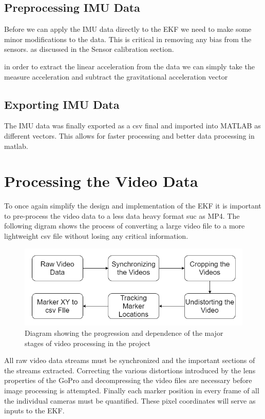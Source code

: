 \subsection{Preprocessing IMU Data}
Before we can apply the IMU data directly to the EKF we need to make some minor modifications to the data. This is critical in removing any bias from the sensors. as discussed in the Sensor calibration section.

in order to extract the linear acceleration from the data we can simply take the measure acceleration and subtract the gravitational acceleration vector

\subsection{Exporting IMU Data}
The IMU data was finally exported as a csv final and imported into MATLAB as different vectors. This allows for faster processing and better data processing in matlab.





\section{Processing the Video Data}
To once again simplify the design and implementation of the EKF it is important to pre-process the video data to a less data heavy format suc as MP4. The following digram shows the process of converting a large video file to a more lightweight csv file without losing any critical information.

\begin{figure}[!ht]
\captionsetup{width=0.8\linewidth, font=small}  
\includegraphics[width=\linewidth]{figures/videoProcess.png}
\caption{Diagram showing the progression and dependence of the major stages of video processing in the project}
\label{fig:videoProcess}
\end{figure}

All raw video data streams must be synchronized and the important sections of the streams extracted. Correcting the various distortions introduced by the lens properties of the GoPro  and decompressing the video files are necessary before image processing is attempted. Finally each marker position in every frame of all the individual cameras must be quantified. These pixel coordinates will serve as inputs to the EKF. 

